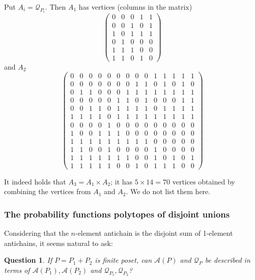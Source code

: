 \documentclass[11pt,a4paper,abstract=yes]{scrartcl}
\theoremstyle{plain}
\newtheorem{question}[theorem]{Question}
\newcommand{\prpolytope}[1]{\mathcal{Q}_{#1}}
\newcommand{\twoanti}[1]{\mathcal{A}({#1})}
\begin{document}
\begin{mexample}
\begin{center}
\begin{tabular}{c|c|c}
\end{tabular}\end{center}

Put \(A_{i} = \prpolytope{P_{i}}\). Then \(A_{1}\) has vertices (columns in the matrix)
\label{}
\begin{displaymath}
\left(\begin{array}{rrrrr}
0 & 0 & 0 & 1 & 1 \\
0 & 0 & 1 & 0 & 1 \\
1 & 0 & 1 & 1 & 1 \\
0 & 1 & 0 & 0 & 0 \\
1 & 1 & 1 & 0 & 0 \\
1 & 1 & 0 & 1 & 0
\end{array}\right)
\end{displaymath}
and \(A_{2}\)
\label{}
\begin{displaymath}
\left(\begin{array}{rrrrrrrrrrrrrr}
0 & 0 & 0 & 0 & 0 & 0 & 0 & 0 & 0 & 1 & 1 & 1 & 1 & 1 \\
0 & 0 & 0 & 0 & 0 & 0 & 0 & 1 & 1 & 0 & 1 & 0 & 1 & 0 \\
0 & 1 & 1 & 0 & 0 & 0 & 1 & 1 & 1 & 1 & 1 & 1 & 1 & 1 \\
0 & 0 & 0 & 0 & 0 & 1 & 1 & 0 & 1 & 0 & 0 & 0 & 1 & 1 \\
0 & 0 & 1 & 1 & 0 & 1 & 1 & 1 & 1 & 0 & 1 & 1 & 1 & 1 \\
1 & 1 & 1 & 1 & 0 & 1 & 1 & 1 & 1 & 1 & 1 & 1 & 1 & 1 \\
0 & 0 & 0 & 0 & 1 & 0 & 0 & 0 & 0 & 0 & 0 & 0 & 0 & 0 \\
1 & 0 & 0 & 1 & 1 & 1 & 0 & 0 & 0 & 0 & 0 & 0 & 0 & 0 \\
1 & 1 & 1 & 1 & 1 & 1 & 1 & 1 & 1 & 0 & 0 & 0 & 0 & 0 \\
1 & 1 & 0 & 0 & 1 & 0 & 0 & 0 & 0 & 1 & 0 & 0 & 0 & 0 \\
1 & 1 & 1 & 1 & 1 & 1 & 1 & 0 & 0 & 1 & 0 & 1 & 0 & 1 \\
1 & 1 & 1 & 1 & 1 & 0 & 0 & 1 & 0 & 1 & 1 & 1 & 0 & 0
\end{array}\right)
\end{displaymath}

It indeed holds that \(A_{3} = A_{1} \times A_{2}\); it has \(5 \times 14 = 70\) vertices obtained by combining the vertices from
\(A_{1}\) and \(A_{2}\). We do not list them here.
\end{mexample}
\subsubsection{The probability functions polytopes of disjoint unions}
\label{sec:org0a26e67}
Considering that the \(n\)-element antichain is the disjoint sum of 1-element antichains,
it seems natural to ask:
\begin{question}
If \(P=P_{1} + P_{2}\) is finite poset, can \(\twoanti{P}\) and \(\prpolytope{P}\)
be described in terms of \(\twoanti{P_{1}}, \twoanti{P_{2}}\) and \(\prpolytope{P_{1}}, \prpolytope{P_{2}}\)?
\end{question}
\end{document}
